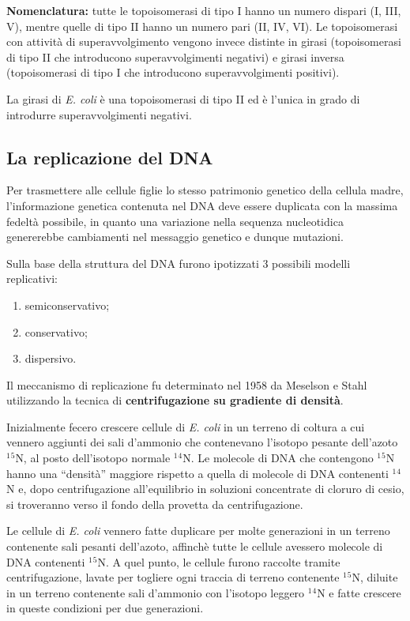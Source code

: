 \documentclass[]{article}
\begin{document}
\textbf{Nomenclatura:} tutte le topoisomerasi di tipo I hanno un numero
dispari (I, III, V), mentre quelle di tipo II hanno un numero pari (II,
IV, VI). Le topoisomerasi con attività di superavvolgimento vengono
invece distinte in girasi (topoisomerasi di tipo II che introducono
superavvolgimenti negativi) e girasi inversa (topoisomerasi di tipo I
che introducono superavvolgimenti positivi).

La girasi di \emph{E. coli} è una topoisomerasi di tipo II ed è l'unica
in grado di introdurre superavvolgimenti negativi.

\subsection{La replicazione del DNA}\label{la-replicazione-del-dna}

Per trasmettere alle cellule figlie lo stesso patrimonio genetico della
cellula madre, l'informazione genetica contenuta nel DNA deve essere
duplicata con la massima fedeltà possibile, in quanto una variazione
nella sequenza nucleotidica genererebbe cambiamenti nel messaggio
genetico e dunque mutazioni.

Sulla base della struttura del DNA furono ipotizzati 3 possibili modelli
replicativi:

\begin{enumerate}
\def\labelenumi{\arabic{enumi}.}
\itemsep1pt\parskip0pt
\item
  semiconservativo;
\item
  conservativo;
\item
  dispersivo.
\end{enumerate}

Il meccanismo di replicazione fu determinato nel 1958 da Meselson e
Stahl utilizzando la tecnica di \textbf{centrifugazione su gradiente di
densità}.

Inizialmente fecero crescere cellule di \emph{E. coli} in un terreno di
coltura a cui vennero aggiunti dei sali d'ammonio che contenevano
l'isotopo pesante dell'azoto \(^1\)\(^5\)N, al posto dell'isotopo
normale \(^1\)\(^4\)N. Le molecole di DNA che contengono \(^1\)\(^5\)N
hanno una ``densità'' maggiore rispetto a quella di molecole di DNA
contenenti \(^1\)\(^4\)N e, dopo centrifugazione all'equilibrio in
soluzioni concentrate di cloruro di cesio, si troveranno verso il fondo
della provetta da centrifugazione.

Le cellule di \emph{E. coli} vennero fatte duplicare per molte
generazioni in un terreno contenente sali pesanti dell'azoto, affinchè
tutte le cellule avessero molecole di DNA contenenti \(^1\)\(^5\)N. A
quel punto, le cellule furono raccolte tramite centrifugazione, lavate
per togliere ogni traccia di terreno contenente \(^1\)\(^5\)N, diluite
in un terreno contenente sali d'ammonio con l'isotopo leggero
\(^1\)\(^4\)N e fatte crescere in queste condizioni per due generazioni.
\end{document}
